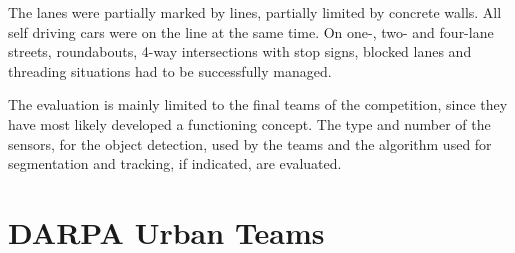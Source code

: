 \documentclass[11pt,oneside,openright]{mpreport}
\begin{document}
The lanes were partially marked by lines, partially limited by concrete walls. All self driving cars were on the line at the same time.
On one-, two- and four-lane streets, roundabouts, 4-way intersections with stop signs, blocked lanes and threading situations had to be successfully managed.
 

The evaluation is mainly limited to the final teams of the competition, since they have most likely developed a functioning concept.
The type and number of the sensors, for the object detection, used by the teams and the algorithm used for segmentation and tracking, if indicated, are evaluated.


\section{DARPA Urban Teams}
\end{document}
